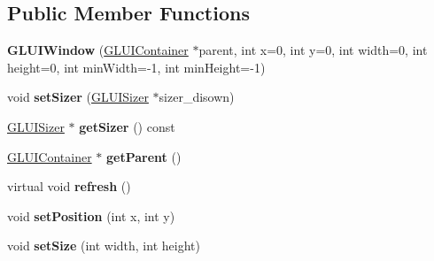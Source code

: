 \subsection*{Public Member Functions}
\begin{DoxyCompactItemize}
\item 
\hypertarget{classCartWheel_1_1GL_1_1GLUIWindow_af5b336342230a5a346cdc610e8dafd68}{
{\bfseries GLUIWindow} (\hyperlink{classCartWheel_1_1GL_1_1GLUIContainer}{GLUIContainer} $\ast$parent, int x=0, int y=0, int width=0, int height=0, int minWidth=-\/1, int minHeight=-\/1)}
\label{classCartWheel_1_1GL_1_1GLUIWindow_af5b336342230a5a346cdc610e8dafd68}

\item 
\hypertarget{classCartWheel_1_1GL_1_1GLUIWindow_ab215945f4a59590be600e4bc7f17faae}{
void {\bfseries setSizer} (\hyperlink{classCartWheel_1_1GL_1_1GLUISizer}{GLUISizer} $\ast$sizer\_\-disown)}
\label{classCartWheel_1_1GL_1_1GLUIWindow_ab215945f4a59590be600e4bc7f17faae}

\item 
\hypertarget{classCartWheel_1_1GL_1_1GLUIWindow_aa800fbf5b514f41686209f64b352bd21}{
\hyperlink{classCartWheel_1_1GL_1_1GLUISizer}{GLUISizer} $\ast$ {\bfseries getSizer} () const }
\label{classCartWheel_1_1GL_1_1GLUIWindow_aa800fbf5b514f41686209f64b352bd21}

\item 
\hypertarget{classCartWheel_1_1GL_1_1GLUIWindow_a61da9d5e13d3ada02c1574a26eaca8c5}{
\hyperlink{classCartWheel_1_1GL_1_1GLUIContainer}{GLUIContainer} $\ast$ {\bfseries getParent} ()}
\label{classCartWheel_1_1GL_1_1GLUIWindow_a61da9d5e13d3ada02c1574a26eaca8c5}

\item 
\hypertarget{classCartWheel_1_1GL_1_1GLUIWindow_a9014bf2cda2b0f77f29002ca434319ad}{
virtual void {\bfseries refresh} ()}
\label{classCartWheel_1_1GL_1_1GLUIWindow_a9014bf2cda2b0f77f29002ca434319ad}

\item 
\hypertarget{classCartWheel_1_1GL_1_1GLUIWindow_a3dd7c923ed4cea6aa9cf64e97e0cce35}{
void {\bfseries setPosition} (int x, int y)}
\label{classCartWheel_1_1GL_1_1GLUIWindow_a3dd7c923ed4cea6aa9cf64e97e0cce35}

\item 
\hypertarget{classCartWheel_1_1GL_1_1GLUIWindow_ab2f79353e37a21d3111b8d61e0b0c8e0}{
void {\bfseries setSize} (int width, int height)}
\label{classCartWheel_1_1GL_1_1GLUIWindow_ab2f79353e37a21d3111b8d61e0b0c8e0}


\end{DoxyCompactItemize}
